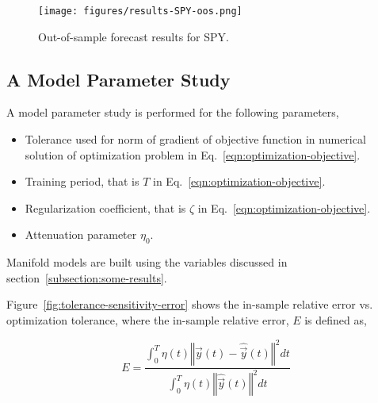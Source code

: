 \documentclass{article}
\begin{document}
\begin{figure}\label{fig:results-spy-oos}
\texttt{[image: figures/results-SPY-oos.png]}
\caption{Out-of-sample forecast results for SPY.}
\end{figure}

\subsection{A Model Parameter Study}\label{subsection:model-parameter-study}

A model parameter study is performed for the following parameters,

\begin{itemize}

    \item Tolerance used for norm of gradient of objective function in
      numerical solution of optimization problem in
      Eq.~\ref{eqn:optimization-objective}.
  
    \item Training period, that is $T$ in
      Eq.~\ref{eqn:optimization-objective}.
  
    \item Regularization coefficient, that is $\zeta$ in
      Eq.~\ref{eqn:optimization-objective}.

    \item Attenuation parameter $\eta_{0}$.
      
\end{itemize}

Manifold models are built using the variables discussed in
section~\ref{subsection:some-results}.

Figure~\ref{fig:tolerance-sensitivity-error} shows the in-sample
relative error vs. optimization tolerance, where the in-sample
relative error, $E$ is defined as,

\begin{equation}\label{eqn:in-sample-error}
E = \frac{\int_{0}^{T} \eta(t) \left\Vert \vec{y}(t) -
  \hat{\vec{y}}(t) \right\Vert^{2} dt}{\int_{0}^{T} \eta(t) \left\Vert
  \hat{\vec{y}}(t) \right\Vert^{2} dt}
\end{equation}
\end{document}
